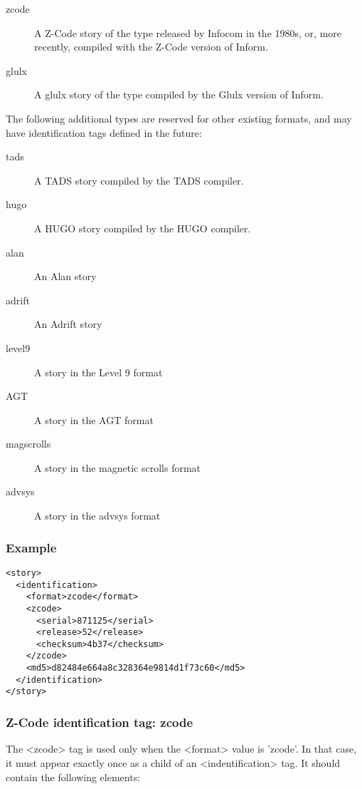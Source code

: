\documentclass[a4paper,11pt]{article}
\begin{document}
\begin{description}
\item[zcode] A Z-Code story of the type released by Infocom in the 1980s, or, more
recently, compiled with the Z-Code version of Inform.
\item[glulx] A glulx story of the type compiled by the Glulx version of Inform.
\end{description}

The following additional types are reserved for other existing formats, and may have
identification tags defined in the future:

\begin{description}
\item[tads] A TADS story compiled by the TADS compiler.
\item[hugo] A HUGO story compiled by the HUGO compiler.
\item[alan] An Alan story
\item[adrift] An Adrift story
\item[level9] A story in the Level 9 format
\item[AGT] A story in the AGT format
\item[magscrolls] A story in the magnetic scrolls format
\item[advsys] A story in the advsys format
\end{description}

\subsubsection{Example}

\begin{example}
\begin{verbatim}
<story>
  <identification>
    <format>zcode</format>
    <zcode>
      <serial>871125</serial>
      <release>52</release>
      <checksum>4b37</checksum>
    </zcode>
    <md5>d82484e664a8c328364e9814d1f73c60</md5>
  </identification>
</story>
\end{verbatim}
\end{example}

\subsubsection{Z-Code identification tag: zcode}

The <zcode> tag is used only when the <format> value is 'zcode'. In that case, it must
appear exactly once as a child of  an <indentification> tag. It should contain the following
elements:
\end{document}
